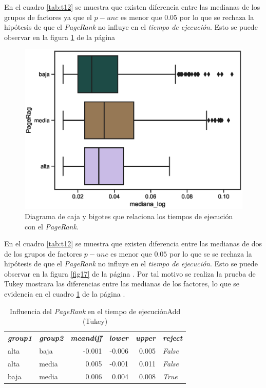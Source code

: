 \documentclass{article}
\begin{document}
En el cuadro \ref{tab:t12} se muestra que existen diferencia entre las medianas de los grupos de factores ya que el \emph{$p-unc$} es menor que $0.05$ por lo que se rechaza la hipótesis de que el \textit{PageRank} no influye en el \textit{tiempo de ejecución}. Esto se puede observar en la figura \ref{fig18} de la página \pageref{fig18}

\begin{center}
\begin{figure}[htbp]
\includegraphics[scale=0.6]{boxplot_PageRag.eps}
\caption{Diagrama de caja y bigotes que relaciona los tiempos de ejecución con el \textit{PageRank}.}
\label{fig18}
\end{figure}
\end{center}


En el cuadro \ref{tab:t12} se muestra que existen  diferencia entre las medianas de dos de los grupos de factores  \textbf{$p-unc$} es menor que $0.05$ por lo que se se rechaza la hipótesis de que el \textit{PageRank} no influye en el \textit{tiempo de ejecución}. Esto se puede observar en la figura \ref{fig17} de la página \pageref{fig17}. Por tal motivo se realiza la prueba de Tukey mostrara las diferencias entre las medianas de los factores, lo que se evidencia en el cuadro \ref{tab:t19} de la página \pageref{tab:t19}.

\begin{table}[htbp]
  \centering
  \caption{Influencia del \textit{PageRank} en el tiempo de ejecuciónAdd (Tukey)}
    \begin{tabular}{llrrrl}
    \textit{\textbf{group1}} & \textit{\textbf{group2}} & \multicolumn{1}{l}{\textit{\textbf{meandiff}}} & \multicolumn{1}{l}{\textit{\textbf{lower}}} & \multicolumn{1}{l}{\textit{\textbf{upper}}} & \textit{\textbf{reject}} \\
    alta  & baja  & -0.001 & -0.006 & 0.005 & \textit{False} \\
    alta  & media & 0.005 & -0.001 & 0.011 & \textit{False} \\
    baja  & media & 0.006 & 0.004 & 0.008 & \textit{True} \\
    \end{tabular}%
  \label{tab:t19}%
\end{table}%
\end{document}
